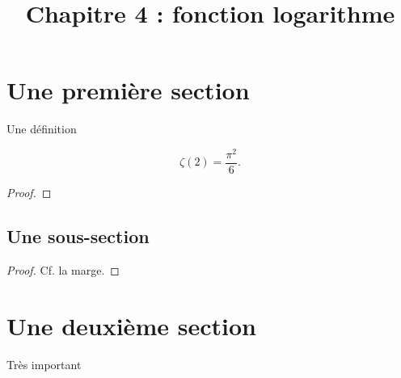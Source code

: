 \documentclass[11pt]{article}
\title{Chapitre 4 : fonction logarithme}
\date{}
\author{}
\begin{document}
\maketitle\thispagestyle{fancy}

\lipsum[1][1-5]

\section{Une première section}

\lipsum[10]

\begin{defi}{Une définition}
  \lipsum[6][1-4]
\end{defi}

\lipsum[8][1-5]

\begin{prop}
  \lipsum[7][1-2]
  \[
    \zeta(2) = \frac{\pi^2}{6}.
  \]
\end{prop}

\begin{proof}
  \lipsum[2]
\end{proof}

\subsection{Une sous-section}

\lipsum[3][1-5]

\begin{rmq}
  \lipsum[4][1-4]
\end{rmq}

\lipsum[3]

\begin{thm}
  \lipsum[4][1-3] 
\end{thm}

\begin{proof}
  Cf. la marge.
\end{proof}

\section{Une deuxième section}

\lipsum[3]

\begin{thmnom}{Très important}
  \lipsum[9]
\end{thmnom}

\begin{exemple}
  \lipsum[6]
\end{exemple}

\begin{exo}
  \lipsum[3]
\end{exo}

\begin{exo}
  \lipsum[4][1-5]
\end{exo}
\end{document}
